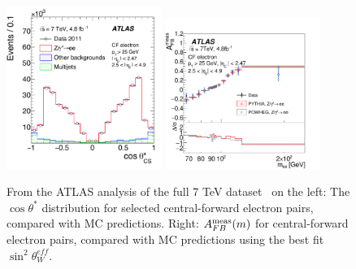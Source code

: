 \begin{figure}[p]
    \centering
    \includegraphics[width=0.45\textwidth]{figures/ss-precision-afb-atlas-cf-ct.pdf}
    \includegraphics[width=0.45\textwidth]{figures/ss-precision-afb-atlas-cf-afb.pdf}
    \caption{
    From the ATLAS analysis of the full 7 TeV dataset~\cite{Aad:2015uau} on the left: The $\cos\theta^*$ distribution for selected central-forward electron pairs, compared with MC predictions.
    Right: $A^{\rm meas}_{FB}(m)$ for central-forward electron pairs, compared with MC predictions using the best fit $\sin^2\theta^{eff}_{W}$.}
    \label{fig:ss-precision-afb-atlas-cf}
\end{figure}

